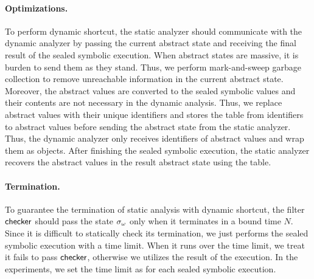 \paragraph{Optimizations.}
To perform dynamic shortcut, the static analyzer should communicate with the
dynamic analyzer by passing the current abstract state and receiving the final
result of the sealed symbolic execution.  When abstract states are massive, it
is burden to send them as they stand.  Thus, we perform mark-and-sweep garbage
collection to remove unreachable information in the current abstract state.
Moreover, the abstract values are converted to the sealed symbolic values and
their contents are not necessary in the dynamic analysis.  Thus, we replace
abstract values with their unique identifiers and stores the table from
identifiers to abstract values before sending the abstract state
from the static analyzer.  Thus, the dynamic analyzer only receives identifiers
of abstract values and wrap them as  objects.  After finishing the
sealed symbolic execution, the static analyzer recovers the abstract values in
the result abstract state using the table.


\paragraph{Termination.}
To guarantee the termination of static analysis with dynamic shortcut, the
filter $\textsf{checker}$ should pass the state ${\sigma}_\omega$ only when it terminates in a
bound time $N$.  Since it is difficult to statically check its termination,
we just performs the sealed symbolic execution with a time limit.  When it runs
over the time limit, we treat it fails to pass $\textsf{checker}$, otherwise we utilizes
the result of the execution.  In the experiments, we set the time limit as
 for each sealed symbolic execution.




